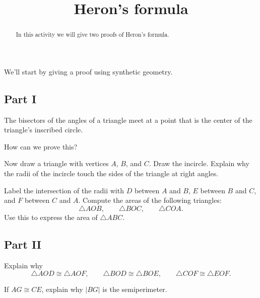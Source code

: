 \documentclass{ximera}
\title{Heron's formula}
\begin{document}
\begin{abstract}
In this activity we will give two proofs of Heron's formula.
\end{abstract}
\maketitle


We'll start by giving a proof using synthetic geometry. 

\subsection*{Part I}

\begin{proposition}
The bisectors of the angles of a triangle meet at a point that is the center of the triangle's inscribed circle.
\end{proposition}

\begin{question}
How can we prove this?
\end{question}

\begin{question}
Now draw a triangle with vertices $A$, $B$, and $C$. Draw the incircle. Explain why the radii of the incircle touch the sides of the triangle at right angles. 
\end{question}

\begin{question}
Label the intersection of the radii with $D$ between $A$ and $B$, $E$ between $B$ and $C$, and $F$ between $C$ and $A$. Compute the areas of the following triangles:
\[
\triangle AOB,\qquad \triangle BOC,\qquad \triangle COA.
\]
Use this to express the area of $\triangle ABC$. 
\end{question}

\subsection*{Part II}

\begin{question}
Explain why
\[
\triangle AOD \cong \triangle AOF,\qquad
\triangle BOD \cong \triangle BOE,\qquad
\triangle COF \cong \triangle EOF.
\]
\end{question}


\begin{question}
If $AG \cong CE$, explain why $|BG|$ is the semiperimeter. 
\end{question}
\end{document}
